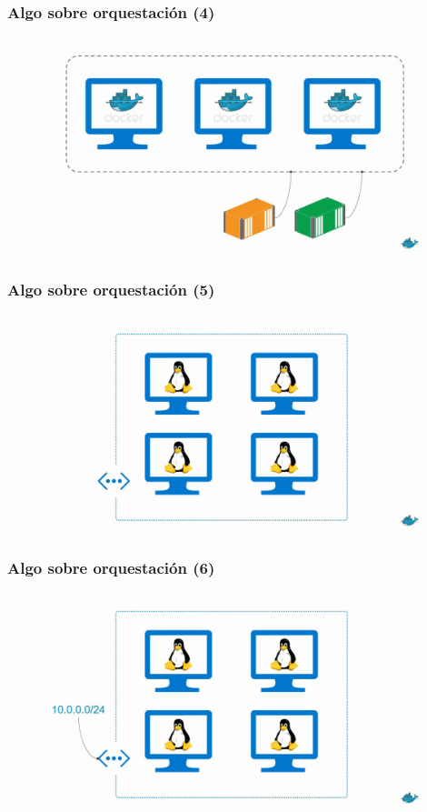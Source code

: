 \documentclass{beamer}
\begin{document}
\begin{frame}
  \frametitle{Algo sobre orquestación (4)}
	\begin{figure}[htp]
	\centering
	\includegraphics[width=0.95\linewidth]{img/orquestacion_4.png}
	\end{figure}
\end{frame}

\begin{frame}
  \frametitle{Algo sobre orquestación (5)}
	\begin{figure}[htp]
	\centering
	\includegraphics[width=0.95\linewidth]{img/orquestacion_5.png}
	\end{figure}
\end{frame}

\begin{frame}
  \frametitle{Algo sobre orquestación (6)}
	\begin{figure}[htp]
	\centering
	\includegraphics[width=0.95\linewidth]{img/orquestacion_6.png}
	\end{figure}
\end{frame}
\end{document}
